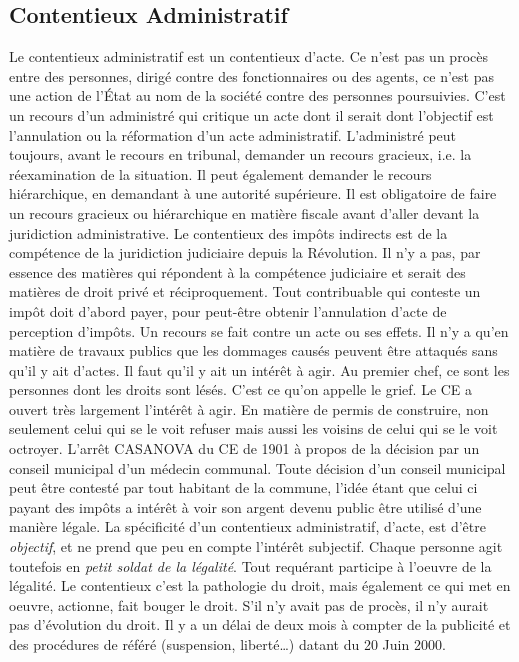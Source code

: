 \documentclass[math]{cours}
\begin{document}
\subsection{Contentieux Administratif}
Le contentieux administratif est un contentieux d'acte.
Ce n'est pas un procès entre des personnes, dirigé contre des fonctionnaires ou des agents, ce n'est pas une action de l'État au nom de la société contre des personnes poursuivies.
C'est un recours d'un administré qui critique un acte dont il serait dont l'objectif est l'annulation ou la réformation d'un acte administratif.
L'administré peut toujours, avant le recours en tribunal, demander un recours gracieux, i.e. la réexamination de la situation.
Il peut également demander le recours hiérarchique, en demandant à une autorité supérieure.
Il est obligatoire de faire un recours gracieux ou hiérarchique en matière fiscale avant d'aller devant la juridiction administrative.
Le contentieux des impôts indirects est de la compétence de la juridiction judiciaire depuis la Révolution.
Il n'y a pas, par essence des matières qui répondent à la compétence judiciaire et serait des matières de droit privé et réciproquement.
Tout contribuable qui conteste un impôt doit d'abord payer, pour peut-être obtenir l'annulation d'acte de perception d'impôts.
Un recours se fait contre un acte ou ses effets.
Il n'y a qu'en matière de travaux publics que les dommages causés peuvent être attaqués sans qu'il y ait d'actes.
Il faut qu'il y ait un intérêt à agir.
Au premier chef, ce sont les personnes dont les droits sont lésés. C'est ce qu'on appelle le grief.
Le CE a ouvert très largement l'intérêt à agir.
En matière de permis de construire, non seulement celui qui se le voit refuser mais aussi les voisins de celui qui se le voit octroyer.
L'arrêt CASANOVA du CE de 1901 à propos de la décision par un conseil municipal d'un médecin communal.
Toute décision d'un conseil municipal peut être contesté par tout habitant de la commune, l'idée étant que celui ci payant des impôts a intérêt à voir son argent devenu public être utilisé d'une manière légale.
La spécificité d'un contentieux administratif, d'acte, est d'être \emph{objectif}, et ne prend que peu en compte l'intérêt subjectif.
Chaque personne agit toutefois en \textit{petit soldat de la légalité}.
Tout requérant participe à l'oeuvre de la légalité.
Le contentieux c'est la pathologie du droit, mais également ce qui met en oeuvre, actionne, fait bouger le droit.
S'il n'y avait pas de procès, il n'y aurait pas d'évolution du droit.
Il y a un délai de deux mois à compter de la publicité et des procédures de référé (suspension, liberté\ldots) datant du 20 Juin 2000.
\end{document}

